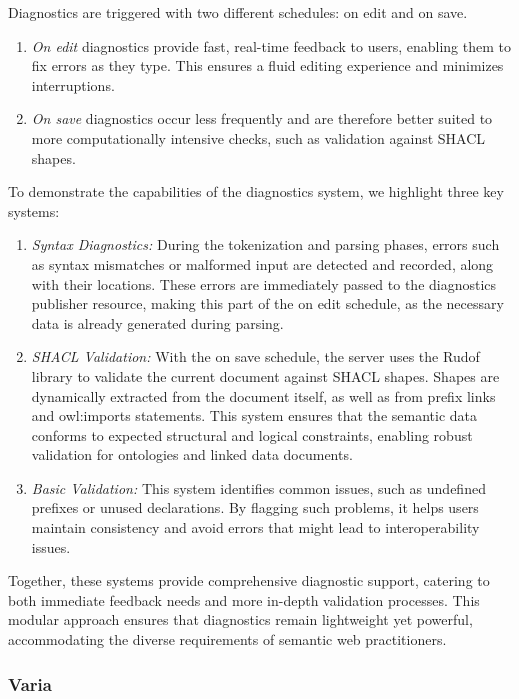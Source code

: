 Diagnostics are triggered with two different schedules: on edit and on save.

\begin{enumerate}
  \item \textit{On edit} diagnostics provide fast, real-time feedback to users, enabling them to fix errors as they type. 
    This ensures a fluid editing experience and minimizes interruptions.
  \item \textit{On save} diagnostics occur less frequently and are therefore better suited to more computationally intensive checks,
   such as validation against SHACL shapes.
\end{enumerate}

To demonstrate the capabilities of the diagnostics system, we highlight three key systems:

\begin{enumerate}
  \item \textit{Syntax Diagnostics:}
    During the tokenization and parsing phases, errors such as syntax mismatches or malformed input are detected and recorded, along with their locations.
    These errors are immediately passed to the diagnostics publisher resource, making this part of the on edit schedule, as the necessary data is already generated during parsing.
  \item \textit{SHACL Validation:} 
    With the on save schedule, the server uses the Rudof library to validate the current document against SHACL shapes.
    Shapes are dynamically extracted from the document itself, as well as from prefix links and owl:imports statements.
    This system ensures that the semantic data conforms to expected structural and logical constraints, enabling robust validation for ontologies and linked data documents.
  \item \textit{Basic Validation:}
    This system identifies common issues, such as undefined prefixes or unused declarations.
    By flagging such problems, it helps users maintain consistency and avoid errors that might lead to interoperability issues.
\end{enumerate}

Together, these systems provide comprehensive diagnostic support, catering to both immediate feedback needs and more in-depth validation processes.
This modular approach ensures that diagnostics remain lightweight yet powerful, accommodating the diverse requirements of semantic web practitioners.

\subsubsection{Varia}

